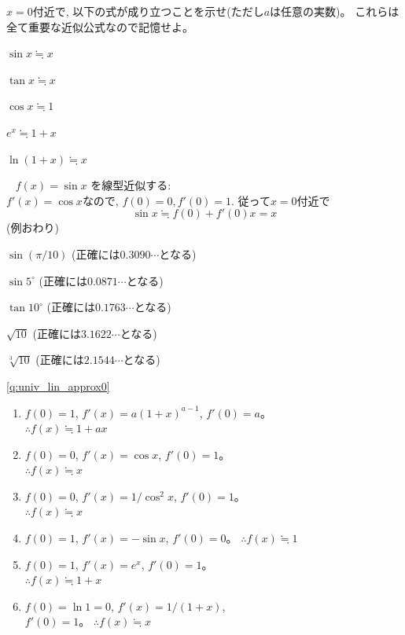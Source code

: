 \begin{q}\label{q:univ_lin_approx0} $x=0$付近で, 以下の式が成り立つことを示せ(ただし$a$は任意の実数)。
これらは全て重要な近似公式なので記憶せよ。
\begin{edaenumerate}
\item $\sin x \fallingdotseq x$
\item $\tan x \fallingdotseq x$
\item $\cos x \fallingdotseq 1$
\item $e^x \fallingdotseq 1+x$
\item $\ln (1+x) \fallingdotseq x$
\end{edaenumerate}\end{q}


\begin{exmpl} $\,\,\,\,\,f(x)=\sin x$ を線型近似する:\\
$f'(x)=\cos x$なので, $f(0)=0, f'(0)=1$. 従って$x=0$付近で
\begin{equation}\sin x\fallingdotseq f(0)+f'(0)x = x\end{equation}
(例おわり)\end{exmpl}
\mv

\item $\sin (\pi/10)$ (正確には$0.3090\cdots$となる)
\item $\sin 5^{\circ}$ (正確には$0.0871\cdots$となる)
\item $\tan 10^{\circ}$ (正確には$0.1763\cdots$となる)
\item $\sqrt{10}$ (正確には$3.1622\cdots$となる)
\item $\sqrt[3]{10}$ (正確には$2.1544\cdots$となる)





\ref{q:univ_lin_approx0}  \
\begin{enumerate}
\item $f(0)=1$, 
       $f'(x)=a(1+x)^{a-1}$, $f'(0)=a$。\\
       $\therefore f(x) \fallingdotseq 1+ax$
\item $f(0)=0$, 
       $f'(x)=\cos x$,
       $f'(0)=1$。\\
       $\therefore f(x) \fallingdotseq x$
\item $f(0)=0$, 
       $f'(x)=1/\cos^{2}{x}$, 
       $f'(0)=1$。\\
       $\therefore f(x) \fallingdotseq x$
\item $f(0)=1$, 
       $f'(x)=-\sin{x}$,
       $f'(0)=0$。
       $\therefore f(x) \fallingdotseq 1$
\item $f(0)=1$, 
       $f'(x)=e^{x}$, $f'(0)=1$。\\
       $\therefore f(x) \fallingdotseq 1+x$
\item $f(0)=\ln 1=0$, 
       $f'(x)=1/(1+x)$, \\$f'(0)=1$。
       $\therefore f(x) \fallingdotseq x$ 
\end{enumerate}
\hv

